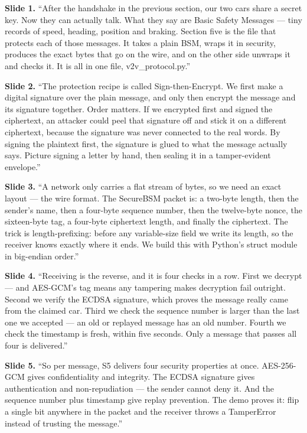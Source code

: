 \documentclass[11pt,a4paper]{article}
\begin{document}
\textbf{Slide 1.} ``After the handshake in the previous section, our two cars
share a secret key. Now they can actually talk. What they say are Basic Safety
Messages --- tiny records of speed, heading, position and braking. Section five
is the file that protects each of those messages. It takes a plain BSM, wraps it
in security, produces the exact bytes that go on the wire, and on the other side
unwraps it and checks it. It is all in one file, v2v\_protocol.py.''

\textbf{Slide 2.} ``The protection recipe is called Sign-then-Encrypt. We first
make a digital signature over the plain message, and only then encrypt the
message and its signature together. Order matters. If we encrypted first and
signed the ciphertext, an attacker could peel that signature off and stick it on
a different ciphertext, because the signature was never connected to the real
words. By signing the plaintext first, the signature is glued to what the
message actually says. Picture signing a letter by hand, then sealing it in a
tamper-evident envelope.''

\textbf{Slide 3.} ``A network only carries a flat stream of bytes, so we need an
exact layout --- the wire format. The SecureBSM packet is: a two-byte length,
then the sender's name, then a four-byte sequence number, then the twelve-byte
nonce, the sixteen-byte tag, a four-byte ciphertext length, and finally the
ciphertext. The trick is length-prefixing: before any variable-size field we
write its length, so the receiver knows exactly where it ends. We build this with
Python's struct module in big-endian order.''

\textbf{Slide 4.} ``Receiving is the reverse, and it is four checks in a row.
First we decrypt --- and AES-GCM's tag means any tampering makes decryption fail
outright. Second we verify the ECDSA signature, which proves the message really
came from the claimed car. Third we check the sequence number is larger than the
last one we accepted --- an old or replayed message has an old number. Fourth we
check the timestamp is fresh, within five seconds. Only a message that passes all
four is delivered.''

\textbf{Slide 5.} ``So per message, S5 delivers four security properties at once.
AES-256-GCM gives confidentiality and integrity. The ECDSA signature gives
authentication and non-repudiation --- the sender cannot deny it. And the
sequence number plus timestamp give replay prevention. The demo proves it: flip
a single bit anywhere in the packet and the receiver throws a TamperError instead
of trusting the message.''
\end{document}

